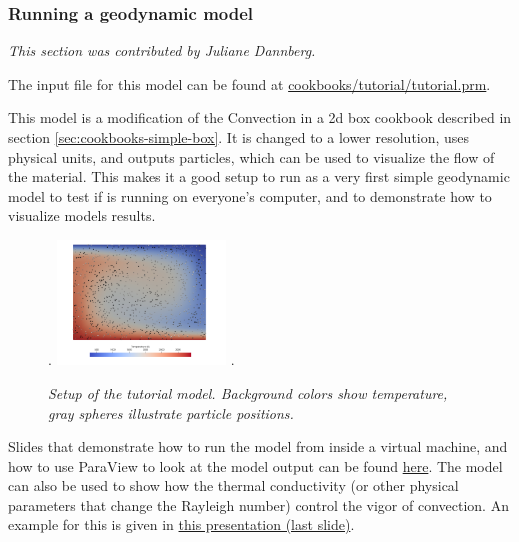 \subsubsection{Running a geodynamic model}
\label{sec:cookbooks-running-a-model}
\textit{This section was contributed by Juliane Dannberg.}

The input file for this model can be found at \url{cookbooks/tutorial/tutorial.prm}.

This model is a modification of the Convection in a 2d box cookbook described in section \ref{sec:cookbooks-simple-box}. 
It is changed to a lower resolution, uses physical units, and outputs particles, which can be used to visualize the flow 
of the material. 
This makes it a good setup to run as a very first simple geodynamic model to test if \aspect{} is running on everyone's
computer, and to demonstrate how to visualize models results. 

\begin{figure}[h]
\phantom.
\hfill
\includegraphics[width=0.4\textwidth]{cookbooks/tutorial/doc/convection-box.png}
\hfill
\phantom.
\caption{\it Setup of the tutorial model. Background colors show temperature, gray spheres illustrate particle positions.}
\label{fig:convection-box-iterations}
\end{figure}

Slides that demonstrate how to run the model from inside a virtual machine, and how to use ParaView to look at the model
output can be found \href{https://www.dropbox.com/s/dmlcf4tx62ts6d1/02_geophysics_tutorial_01_08.pdf?dl=0}{here}. 
The model can also be used to show how the thermal conductivity (or other physical parameters that change the Rayleigh
number) control the vigor of convection. An example for this is given in \href{https://www.dropbox.com/s/nqkxe54poe1op7d/03_geophysics_lecture_01_10.pdf?dl=0}{this presentation (last slide)}.



